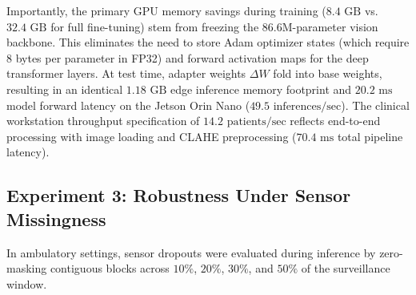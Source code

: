 \documentclass[journal,10pt,twocolumn]{IEEEtran}
\begin{document}
\begin{table}[!h]
\centering
\caption{Experiment 2: Compute Profiling and Memory Allocation. Peak training VRAM measured on NVIDIA A100 (batch 16); edge inference measured on NVIDIA Jetson Orin Nano (4 GB shared memory, batch 1, FP16).}
\label{tab:exp2_efficiency}
\end{table}

Importantly, the primary GPU memory savings during training ($8.4\text{ GB}$ vs. $32.4\text{ GB}$ for full fine-tuning) stem from freezing the 86.6M-parameter vision backbone. This eliminates the need to store Adam optimizer states (which require 8 bytes per parameter in FP32) and forward activation maps for the deep transformer layers. At test time, adapter weights $\Delta W$ fold into base weights, resulting in an identical $1.18\text{ GB}$ edge inference memory footprint and $20.2\text{ ms}$ model forward latency on the Jetson Orin Nano ($49.5\text{ inferences/sec}$). The clinical workstation throughput specification of $14.2\text{ patients/sec}$ reflects end-to-end processing with image loading and CLAHE preprocessing ($70.4\text{ ms}$ total pipeline latency).

\subsection{Experiment 3: Robustness Under Sensor Missingness}
In ambulatory settings, sensor dropouts were evaluated during inference by zero-masking contiguous blocks across $10\%$, $20\%$, $30\%$, and $50\%$ of the surveillance window.
\end{document}
